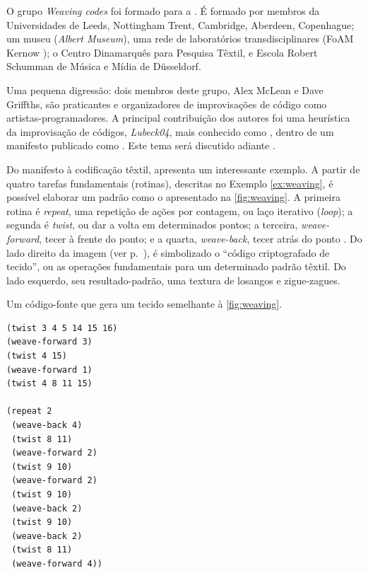O grupo \emph{Weaving codes} foi formado para  a . É formado por membros da Universidades de Leeds, Nottingham Trent, Cambridge, Aberdeen, Copenhague; um museu (\emph{Albert Museum}), uma rede de laboratórios transdisciplinares (FoAM Kernow ); o Centro Dinamarquês para Pesquisa Têxtil, e Escola Robert Schumman de Música e Mídia de  Düsseldorf. 

Uma pequena digressão: dois membros deste grupo, Alex McLean e Dave Griffths, são praticantes e organizadores de improvisações de código como artistas-programadores. A principal contribuição dos autores foi uma heurística da improvisação de códigos, \emph{Lubeck04}, mais conhecido como , dentro de um manifesto publicado como  \cite{ward_live_2004}. Este tema será discutido adiante .

Do manifesto à codificação têxtil,  apresenta um interessante exemplo. A partir de quatro tarefas fundamentais (rotinas), descritas no Exemplo \autoref{ex:weaving}, é possível elaborar um padrão como o apresentado na \autoref{fig:weaving}. A primeira rotina é \emph{repeat}, uma repetição de ações por contagem, ou laço iterativo (\emph{loop}); a segunda é \emph{twist}, ou dar a volta em determinados pontos; a terceira,  \emph{weave-forward}, tecer à frente do ponto; e a quarta, \emph{weave-back}, tecer atrás do ponto . Do lado direito da imagem (ver p.~\pageref{fig:weaving}), é simbolizado o ``código criptografado de tecido'', ou as operações fundamentais para um determinado padrão têxtil. Do lado esquerdo, seu resultado-padrão, uma textura de losangos e zigue-zagues.  

\begin{example}{Um código-fonte que gera um tecido semelhante à \autoref{fig:weaving}.}
\label{ex:weaving}

\begin{verbatim}
(twist 3 4 5 14 15 16)
(weave-forward 3)
(twist 4 15)
(weave-forward 1)
(twist 4 8 11 15)

(repeat 2
 (weave-back 4)
 (twist 8 11)
 (weave-forward 2)
 (twist 9 10)
 (weave-forward 2)
 (twist 9 10)
 (weave-back 2)
 (twist 9 10)
 (weave-back 2)
 (twist 8 11)
 (weave-forward 4))
\end{verbatim}
\end{example}

